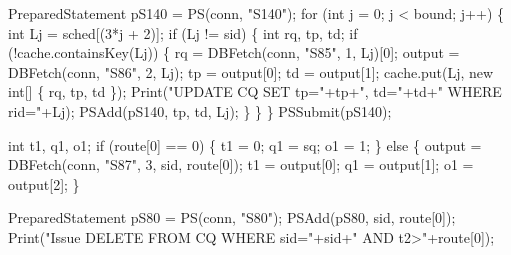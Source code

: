 \documentclass{article}
\def\nwendcode{\endtrivlist \endgroup}      %
\let\nwdocspar=\par
\theoremstyle{definition}                   %
\begin{document}
PreparedStatement pS140 = PS(conn, "S140");
for (int j = 0; j < bound; j++) \{
  int Lj = sched[(3*j + 2)];
  if (Lj != sid) \{
    int rq, tp, td;
    if (!cache.containsKey(Lj)) \{
      rq = DBFetch(conn, "S85", 1, Lj)[0];
      output = DBFetch(conn, "S86", 2, Lj);
      tp = output[0];
      td = output[1];
      cache.put(Lj, new int[] \{ rq, tp, td \});
      Print("UPDATE CQ SET tp="+tp+", td="+td+" WHERE rid="+Lj);
      PSAdd(pS140, tp, td, Lj);
    \}
  \}
\}
PSSubmit(pS140);
\nwendcode{}\nwdocspar
\nwenddocs{}\endmoddef{}
int t1, q1, o1;
if (route[0] == 0) \{
  t1 = 0;
  q1 = sq;
  o1 = 1;
\} else \{
  output = DBFetch(conn, "S87", 3, sid, route[0]);
  t1 = output[0];
  q1 = output[1];
  o1 = output[2];
\}
\nwendcode{}\nwdocspar
\nwenddocs{}\endmoddef{}
PreparedStatement pS80 = PS(conn, "S80");
PSAdd(pS80, sid, route[0]);
Print("Issue DELETE FROM CQ WHERE sid="+sid+" AND t2>"+route[0]);
\end{document}
